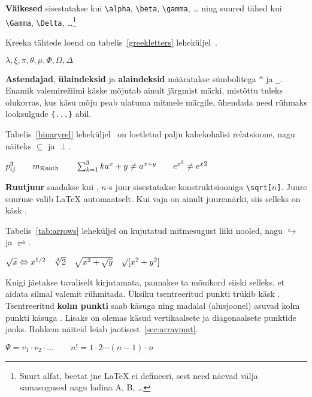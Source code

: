 \textbf{Väikesed } sisestatakse kui \verb|\alpha|,
\verb|\beta|, \verb|\gamma|, \ldots{} ning suured tähed kui
\verb|\Gamma|, \verb|\Delta|, \ldots\footnote{Suurt alfat, beetat jne
\LaTeX{} ei defineeri, sest need näevad välja samasugused nagu ladina A,
B, \ldots}

Kreeka tähtede loend on tabelis~\ref{greekletters}
leheküljel~\pageref{greekletters}.
\begin{example}
$\lambda,\xi,\pi,\theta,
 \mu,\Phi,\Omega,\Delta$
\end{example}

\textbf{Astendajad}, \textbf{ülaindeksid} ja \textbf{alaindeksid}
määratakse
sümbolitega
\verb|^| ja \verb|_|. Enamik
valemire\v{z}iimi käske mõjutab ainult järgmist märki, mistõttu tuleks
olukorras, kus käsu mõju peab ulatuma mitmele märgile, ühendada need
rühmaks looksulgude \verb|{...}| abil.

Tabelis~\ref{binaryrel} leheküljel~\pageref{binaryrel} on loetletud
palju kahekohalisi relatsioone, nagu näiteks $\subseteq$ ja $\perp$.

\begin{example}
$p^3_{ij} \qquad
 m_\text{Knuth}\qquad
\sum_{k=1}^3 k \\[5pt]
 a^x+y \neq a^{x+y}\qquad
 e^{x^2} \neq {e^x}^2$
\end{example}

\textbf{Ruutjuur} saadakse kui , $n$-s juur
sisestatakse konstruktsiooniga \verb|\sqrt[|$n$\verb|]|. Juure suuruse
valib \LaTeX{} automaatselt. Kui vaja on ainult juuremärki, siis selleks
on käsk .

Tabelis~\ref{tab:arrows} leheküljel \pageref{tab:arrows} on kujutatud
mitmesugust liiki nooled, nagu $\hookrightarrow$ ja $\rightleftharpoons$.
\begin{example}
$\sqrt{x} \Leftrightarrow x^{1/2}
 \quad \sqrt[3]{2}
 \quad \sqrt{x^{2} + \sqrt{y}}
 \quad \surd[x^2 + y^2]$
\end{example}


Kuigi \textbf{} jäetakse tavaliselt
kirjutamata, pannakse ta mõnikord siiski selleks, et aidata silmal
valemit rühmitada. Üksiku tsentreeritud punkti trükib käsk .
Tsentreeritud \textbf{kolm
punkti} saab käsuga  ning
madalal (alusjoonel) asuvad kolm punkti käsuga . Lisaks on
olemas käsud  vertikaalsete ja  diagonaalsete punktide jaoks. Rohkem näiteid leiab
jaotisest~\ref{sec:arraymat}.
\begin{example}
$\Psi = v_1 \cdot v_2
 \cdot \ldots \qquad
 n! = 1 \cdot 2
 \cdots (n-1) \cdot n$
\end{example}

